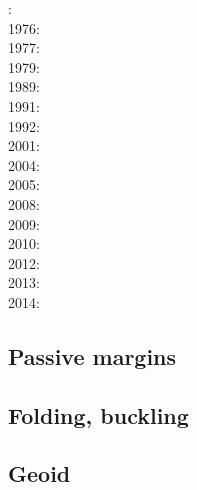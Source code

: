 : \cite{fouy75}\\
1976: \cite{riso76}\\
1977: \cite{chtu77}\\
1979: \cite{riso79}\\
1989: \cite{boww89}\\
1991: \cite{worg91}\\
1992: \cite{rich92}\cite{wuvr92}\cite{zoba92}\cite{clko92}\\
2001: \cite{stsm01}\\
2004: \cite{ligu04}\\
2005: \cite{timr05}\\
2008: \cite{bilr08}\cite{ghhw08}\\
2009: \cite{ghhf09}\cite{nacl09}\\
2010: \cite{bepo10}\\
2012: \cite{nalr12}\cite{ghho12}\\
2013: \cite{ghhw13}\\
2014: \cite{vagw14}


\subsection*{Passive margins} 

\cite{clwv82}
\cite{lies86}
\cite{gebi05}
\cite{clbz08}
\cite{kasb08}
\cite{fasm10}
\cite{nigm10}
\cite{rapy11}
\cite{nigm11}
\cite{brfo11}
\cite{mana13}
\cite{yahb13}
\cite{macg14}
\cite{gebw15}
\cite{nigo15}
\cite{sahf18}
\cite{mube18}
\cite{tebu18}
\cite{zhli19}


\subsection*{Folding, buckling}  

\noindent
\cite{ramb68}
\cite{ramb70}
\cite{ramb71}
\cite{flet91}
\cite{zhhj93}
\cite{flet95}
\cite{zhho96}
\cite{mumh02}
\cite{frsc06}
\cite{schm08}
\cite{resb10}
\cite{freh11}
\cite{reds12}\cite{grsc12}
\cite{regc13}
\cite{freh14}\cite{frex14}
\cite{frsc16}


\subsection*{Geoid}

